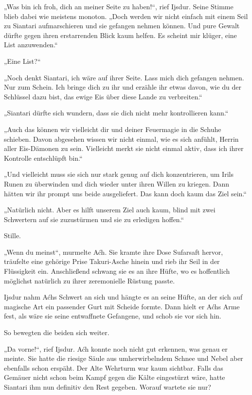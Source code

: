 „Was bin ich froh, dich an meiner Seite zu haben!“, rief Ijsdur. Seine Stimme blieb dabei wie meistens monoton. „Doch werden wir nicht einfach mit einem Seil zu Siantari aufmarschieren und sie gefangen nehmen können. Und pure Gewalt dürfte gegen ihren erstarrenden Blick kaum helfen. Es scheint mir klüger, eine List anzuwenden.“

„Eine List?“

„Noch denkt Siantari, ich wäre auf ihrer Seite. Lass mich dich gefangen nehmen. Nur zum Schein. Ich bringe dich zu ihr und erzähle ihr etwas davon, wie du der Schlüssel dazu bist, das ewige Eis über diese Lande zu verbreiten.“

„Siantari dürfte sich wundern, dass sie dich nicht mehr kontrollieren kann.“

„Auch das können wir vielleicht dir und deiner Feuermagie in die Schuhe schieben. Davon abgesehen wissen wir nicht einmal, wie es sich anfühlt, Herrin aller Eis-Dämonen zu sein. Vielleicht merkt sie nicht einmal aktiv, dass ich ihrer Kontrolle entschlüpft bin.“

„Und vielleicht muss sie sich nur stark genug auf dich konzentrieren, um Irils Runen zu überwinden und dich wieder unter ihren Willen zu kriegen. Dann hätten wir ihr prompt uns beide ausgeliefert. Das kann doch kaum das Ziel sein.“

„Natürlich nicht. Aber es hilft unserem Ziel auch kaum, blind mit zwei Schwertern auf sie zuzustürmen und sie zu erledigen hoffen.“

Stille.

„Wenn du meinst“, murmelte Aćh. Sie kramte ihre Dose Sufarsaft hervor, träufelte eine gehörige Prise Takuri-Asche hinein und rieb ihr Seil in der Flüssigkeit ein. Anschließend schwang sie es an ihre Hüfte, wo es hoffentlich möglichst natürlich zu ihrer zeremonielle Rüstung passte.

Ijsdur nahm Aćhs Schwert an sich und hängte es an seine Hüfte, an der sich auf magische Art ein passender Gurt mit Scheide formte. Dann hielt er Aćhs Arme fest, als wäre sie seine entwaffnete Gefangene, und schob sie vor sich hin.

So bewegten die beiden sich weiter.

„Da vorne!“, rief Ijsdur. Aćh konnte noch nicht gut erkennen, was genau er meinte. Sie hatte die riesige Säule aus umherwirbelndem Schnee und Nebel aber ebenfalls schon erspäht. Der Alte Wehrturm war kaum sichtbar. Falls das Gemäuer nicht schon beim Kampf gegen die Kälte eingestürzt wäre, hatte Siantari ihm nun definitiv den Rest gegeben. Worauf wartete sie nur?

